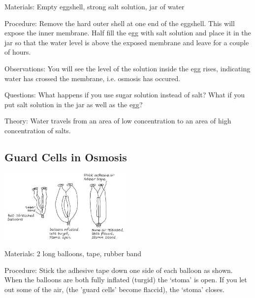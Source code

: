 \begin{multicols}{2}
\begin{description*}
\item[Materials:]{Empty eggshell, strong salt solution, jar of water}
\item[Procedure:]{Remove the hard outer shell at
one end of the eggshell. This will
expose the inner membrane. Half
fill the egg with salt solution and
place it in the jar so that the
water level is above the exposed
membrane and leave for a couple
of hours. }
\item[Observations:]{You will see the level of
the solution inside the egg rises,
indicating water has crossed the
membrane, i.e. osmosis has
occured.}
\item[Questions:]{What happens if you use sugar solution instead of salt? What if you put salt solution in the jar as well as the egg?}
\item[Theory:]{Water travels from an area of low concentration to an area of high concentration of salts.}
\end{description*}

\subsection{Guard Cells in Osmosis}

\begin{center}
\includegraphics[width=0.49\textwidth]{./img/vso/osmosis-guard-cells.jpg}
\end{center}

\begin{description*}
\item[Materials:]{2 long balloons, tape, rubber band}
\item[Procedure:]{Stick the adhesive tape down one
side of each balloon as shown.
When the balloons are both fully
inflated (turgid) the `stoma' is
open. If you let out some of the
air, (the 'guard cells' become
flaccid), the `stoma' closes.}
\end{description*}


\end{multicols}
